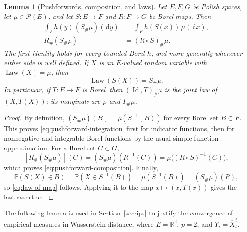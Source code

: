 \documentclass[11pt]{amsart}
\numberwithin{equation}{section}
\theoremstyle{plain}
\newtheorem{lemma}[theorem]{Lemma}
\newcommand{\R}{\mathbb{R}}
\newcommand{\Prob}{\mathbb{P}}
\newcommand{\cP}{\mathcal{P}}
\newcommand{\dd}{\,\mathrm{d}}
\DeclareMathOperator{\Law}{Law}
\DeclareMathOperator{\Id}{Id}
\begin{document}
\begin{lemma}[Pushforwards, composition, and laws]
\label{lem:pushforward-random-variable}
Let $E,F,G$ be Polish spaces, let $\mu\in\cP(E)$, and let
$S:E\to F$ and $R:F\to G$ be Borel maps.  Then
\begin{align}
 \int_F h(y)\,(S_\#\mu)(\dd y)
 &=\int_E h(S(x))\,\mu(\dd x),
 \label{eq:pushforward-integration}\\
 R_\#(S_\#\mu)&=(R\circ S)_\#\mu.
 \label{eq:pushforward-composition}
\end{align}
The first identity holds for every bounded Borel $h$, and more generally
whenever either side is well defined.  If $X$ is an $E$-valued random
variable with $\Law(X)=\mu$, then
\begin{equation}\label{eq:law-of-map}
 \Law(S(X))=S_\#\mu.
\end{equation}
In particular, if $T:E\to F$ is Borel, then
$(\Id,T)_\#\mu$ is the joint law of $(X,T(X))$; its marginals are
$\mu$ and $T_\#\mu$.
\end{lemma}
\begin{proof}
By definition,
$(S_\#\mu)(B)=\mu(S^{-1}(B))$ for every Borel set $B\subset F$.
This proves \eqref{eq:pushforward-integration} first for indicator functions,
then for nonnegative and integrable Borel functions by the usual simple-function
approximation.  For a Borel set $C\subset G$,
\[
 [R_\#(S_\#\mu)](C)
 =(S_\#\mu)(R^{-1}(C))
 =\mu\bigl((R\circ S)^{-1}(C)\bigr),
\]
which proves \eqref{eq:pushforward-composition}.  Finally,
\[
 \Prob(S(X)\in B)=\Prob(X\in S^{-1}(B))
 =\mu(S^{-1}(B))=(S_\#\mu)(B),
\]
so \eqref{eq:law-of-map} follows.  Applying it to the map
$x\mapsto(x,T(x))$ gives the last assertion.
\end{proof}

The following lemma is used in Section~\ref{sec:ips} to justify the convergence of empirical measures
in Wasserstein distance, where $E=\R^d$, $p=2$, and $Y_i=\overline X_t^i$.
\end{document}
